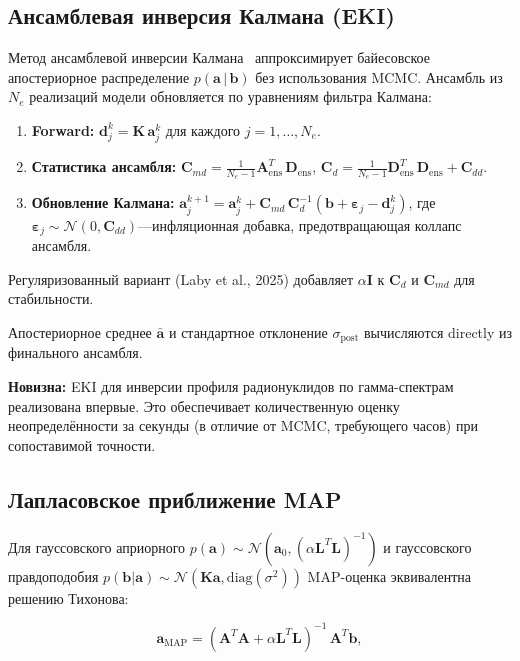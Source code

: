\documentclass[12pt,a4paper]{article}
\newcommand{\va}{\mathbf{a}}
\newcommand{\vb}{\mathbf{b}}
\newcommand{\mK}{\mathbf{K}}
\newcommand{\mA}{\mathbf{A}}
\newcommand{\mL}{\mathbf{L}}
\newcommand{\mD}{\mathbf{D}}
\newcommand{\mI}{\mathbf{I}}
\newcommand{\mC}{\mathbf{C}}
\begin{document}
\subsection{Ансамблевая инверсия Калмана (EKI)}
\label{sub:eki}

Метод ансамблевой инверсии Калмана~\citep{Iglesias2013, Laby2025, Tso2024}
аппроксимирует байесовское апостериорное распределение
$p(\va\,|\,\vb)$ без использования MCMC.
Ансамбль из $N_e$ реализаций модели обновляется
по уравнениям фильтра Калмана:

\begin{enumerate}[leftmargin=*,itemsep=2pt]
  \item \textbf{Forward:} $\mathbf{d}_j^k = \mK\,\va_j^k$ для каждого $j = 1,\ldots,N_e$.
  \item \textbf{Статистика ансамбля:}
        $\mC_{md} = \frac{1}{N_e - 1}\mA_{\mathrm{ens}}^T\,\mD_{\mathrm{ens}}$,
        $\mC_d = \frac{1}{N_e - 1}\mD_{\mathrm{ens}}^T\,\mD_{\mathrm{ens}} + \mC_{dd}$.
  \item \textbf{Обновление Калмана:}
        $\va_j^{k+1} = \va_j^k + \mC_{md}\,\mC_d^{-1}(\vb + \bm{\varepsilon}_j - \mathbf{d}_j^k)$,
        где $\bm{\varepsilon}_j \sim \mathcal{N}(0, \mC_{dd})$---инфляционная
        добавка, предотвращающая коллапс ансамбля.
\end{enumerate}

Регуляризованный вариант (Laby et al., 2025) добавляет $\alpha\mI$
к $\mC_d$ и $\mC_{md}$ для стабильности.

Апостериорное среднее $\bar{\va}$ и стандартное отклонение $\sigma_{\mathrm{post}}$
вычисляются directly из финального ансамбля.

\textbf{Новизна:} EKI для инверсии профиля радионуклидов
по гамма-спектрам реализована впервые.
Это обеспечивает количественную оценку неопределённости
за секунды (в отличие от MCMC, требующего часов)
при сопоставимой точности.

\subsection{Лапласовское приближение MAP}
\label{sub:laplace}

Для гауссовского априорного $p(\va) \sim \mathcal{N}(\va_0, (\alpha\mL^T\mL)^{-1})$
и гауссовского правдоподобия $p(\vb|\va) \sim \mathcal{N}(\mK\va, \mathrm{diag}(\sigma^2))$
MAP-оценка эквивалентна решению Тихонова:

\begin{equation}
  \va_{\mathrm{MAP}} = (\mA^T\mA + \alpha\mL^T\mL)^{-1}\,\mA^T\vb,
\end{equation}
\end{document}
